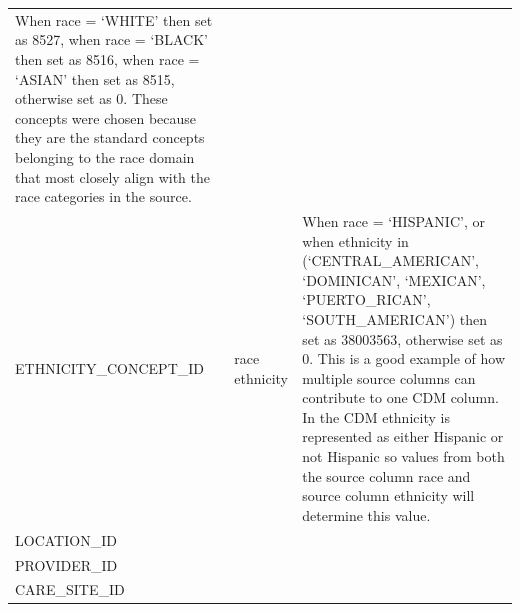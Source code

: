 \documentclass[11pt]{book}
\theoremstyle{definition}
\theoremstyle{definition}
\theoremstyle{definition}
\theoremstyle{remark}
\begin{document}
\begin{longtable}[]{@{}lll@{}}
\begin{minipage}[t]{0.51\columnwidth}
When race = `WHITE' then set as 8527, when race = `BLACK' then set as 8516, when race = `ASIAN' then set as 8515, otherwise set as 0. These concepts were chosen because they are the standard concepts belonging to the race domain that most closely align with the race categories in the source.\strut
\end{minipage}\tabularnewline
\begin{minipage}[t]{0.28\columnwidth}\raggedright
ETHNICITY\_CONCEPT\_ID\strut
\end{minipage} & \begin{minipage}[t]{0.12\columnwidth}\raggedright
race ethnicity\strut
\end{minipage} & \begin{minipage}[t]{0.51\columnwidth}\raggedright
When race = `HISPANIC', or when ethnicity in (`CENTRAL\_AMERICAN', `DOMINICAN', `MEXICAN', `PUERTO\_RICAN', `SOUTH\_AMERICAN') then set as 38003563, otherwise set as 0. This is a good example of how multiple source columns can contribute to one CDM column. In the CDM ethnicity is represented as either Hispanic or not Hispanic so values from both the source column race and source column ethnicity will determine this value.\strut
\end{minipage}\tabularnewline
\begin{minipage}[t]{0.28\columnwidth}\raggedright
LOCATION\_ID\strut
\end{minipage} & \begin{minipage}[t]{0.12\columnwidth}\raggedright
\strut
\end{minipage} & \begin{minipage}[t]{0.51\columnwidth}\raggedright
\strut
\end{minipage}\tabularnewline
\begin{minipage}[t]{0.28\columnwidth}\raggedright
PROVIDER\_ID\strut
\end{minipage} & \begin{minipage}[t]{0.12\columnwidth}\raggedright
\strut
\end{minipage} & \begin{minipage}[t]{0.51\columnwidth}\raggedright
\strut
\end{minipage}\tabularnewline
\begin{minipage}[t]{0.28\columnwidth}\raggedright
CARE\_SITE\_ID\strut
\end{minipage} & \begin{minipage}[t]{0.12\columnwidth}\raggedright
\strut
\end{minipage} & \begin{minipage}[t]{0.51\columnwidth}\raggedright

\end{minipage}
\end{longtable}
\end{document}
